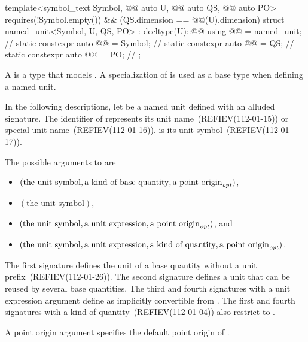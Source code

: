 \begin{codeblock}
{template<symbol_text Symbol, @@ auto U, @@ auto QS,
         @@ auto PO>
  requires(!Symbol.empty()) && (QS.dimension == @@(U).dimension)
struct named_unit<Symbol, U, QS, PO> : decltype(U)::@@ {
  using @@ = named_unit;              // \expos
  static constexpr auto @@ = Symbol;     // \expos
  static constexpr auto @@ = QS;  // \expos
  static constexpr auto @@ = PO;   // \expos
};

}
\end{codeblock}

\pnum
A  is a type that models .
A specialization of  is used as a base type when defining a named unit.

\pnum
In the following descriptions, let  be a named unit defined with an alluded signature.
The identifier of  represents
its unit name~(REFIEV(112-01-15))
or special unit name~(REFIEV(112-01-16)).
 is its unit symbol~(REFIEV(112-01-17)).

\pnum
The possible arguments to  are
\begin{itemize}
\item
$(\text{the unit symbol}, \text{a kind of base quantity}, \text{a point origin}_\mathit{\color{black}opt})$,
\item
$(\text{the unit symbol})$,
\item
$(\text{the unit symbol}, \text{a unit expression}, \text{a point origin}_\mathit{\color{black}opt})$, and
\item
$(\text{the unit symbol}, \text{a unit expression}, \text{a kind of quantity}, \text{a point origin}_\mathit{\color{black}opt})$.
\end{itemize}

\pnum
The first signature defines the unit of a base quantity
without a unit prefix~(REFIEV(112-01-26)).
The second signature defines a unit
that can be reused by several base quantities.
The third and fourth signatures with a unit expression argument 
define  as implicitly convertible from .
The first and fourth signatures with a kind of quantity~(REFIEV(112-01-04)) 
also restrict  to .

\pnum
A point origin argument specifies the default point origin of .

